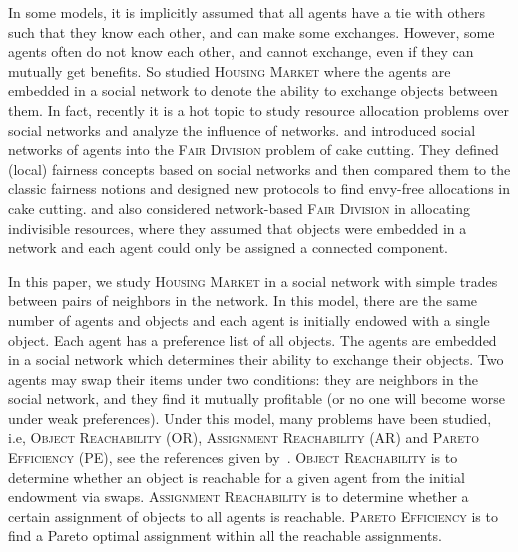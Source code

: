 In some models, it is implicitly assumed that all agents have a tie with others such that they know each other, and can make some exchanges. However, some agents often do not know each other, and cannot exchange,
even if they can mutually get benefits. So %
\citet{DBLP:conf/ijcai/GourvesLW17} studied \textsc{Housing Market} where the agents are embedded in a social network to denote the ability to exchange objects between them.
In fact, recently it is a hot topic to study resource allocation problems over social networks and analyze the influence of networks.
\citet{Abebe2016Fair} and \citet{Bei2017Networked} introduced social networks of agents into the \textsc{Fair Division} problem of cake cutting. They defined (local) fairness concepts based on social networks and then compared them to the classic fairness notions and designed new protocols to find envy-free allocations in cake cutting.
\citet{DBLP:conf/atal/Bredereck0N18} and \citet{beynier2018local} also considered network-based \textsc{Fair Division} in allocating indivisible resources, where they assumed that objects were embedded in a network and each agent could only be assigned a connected component.

In this paper, we study \textsc{Housing Market} in a social network with simple trades between pairs of neighbors in the network. In this model, there are the same number of agents and objects and each agent is initially endowed with a single object.
Each agent has a preference list of all objects. The agents are embedded in a social network which determines their ability to exchange their objects. Two agents may swap their items under two conditions:
they are neighbors in the social network, and they find it mutually profitable (or no one will become worse under weak preferences).
Under this model, many problems have been studied, i.e, \textsc{Object Reachability} (OR), \textsc{Assignment Reachability} (AR) and \textsc{Pareto Efficiency} (PE), see the references given by~\citet{DBLP:conf/ijcai/GourvesLW17}.
\textsc{Object Reachability} is to determine whether an object is reachable for a given agent from the initial endowment via swaps.
\textsc{Assignment Reachability} is to determine whether a certain assignment of objects to all agents is reachable.
\textsc{Pareto Efficiency} is to find a Pareto optimal assignment within all the reachable assignments.

